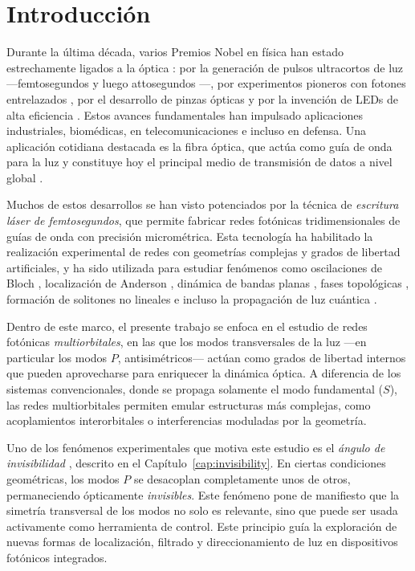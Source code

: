 \chapter{Introducción}

Durante la última década, varios Premios Nobel en física han estado estrechamente ligados a la óptica \cite{nobel}: por la generación de pulsos ultracortos de luz —femtosegundos \cite{femto1} y luego attosegundos \cite{atto1, atto2, atto3}—, por experimentos pioneros con fotones entrelazados \cite{photons1, photons2, photons3}, por el desarrollo de pinzas ópticas \cite{opticaltweezers} y por la invención de LEDs de alta eficiencia \cite{led1, led2, led3}. Estos avances fundamentales han impulsado aplicaciones industriales, biomédicas, en telecomunicaciones e incluso en defensa. Una aplicación cotidiana destacada es la fibra óptica, que actúa como guía de onda para la luz y constituye hoy el principal medio de transmisión de datos a nivel global \cite{fibra2, fibra}.

Muchos de estos desarrollos se han visto potenciados por la técnica de \textit{escritura láser de femtosegundos}, que permite fabricar redes fotónicas tridimensionales de guías de onda con precisión micrométrica. Esta tecnología ha habilitado la realización experimental de redes con geometrías complejas y grados de libertad artificiales, y ha sido utilizada para estudiar fenómenos como oscilaciones de Bloch \cite{BlochOsci}, localización de Anderson \cite{Anderson}, dinámica de bandas planas \cite{lieb1, lieb2, artificialFB, FBdynamics}, fases topológicas \cite{obstopo, obsfloquet, topo1dphoto, toporusos}, formación de solitones no lineales \cite{discretesolitons} e incluso la propagación de luz cuántica \cite{qed, squeezed, topoquantum}.

Dentro de este marco, el presente trabajo se enfoca en el estudio de redes fotónicas \textit{multiorbitales}, en las que los modos transversales de la luz —en particular los modos \( P \), antisimétricos— actúan como grados de libertad internos que pueden aprovecharse para enriquecer la dinámica óptica. A diferencia de los sistemas convencionales, donde se propaga solamente el modo fundamental (\( S \)), las redes multiorbitales permiten emular estructuras más complejas, como acoplamientos interorbitales o interferencias moduladas por la geometría.

Uno de los fenómenos experimentales que motiva este estudio es el \textit{ángulo de invisibilidad} \cite{Pmodecoupling}, descrito en el Capítulo~\ref{cap:invisibility}. En ciertas condiciones geométricas, los modos \( P \) se desacoplan completamente unos de otros, permaneciendo ópticamente \textit{invisibles}. Este fenómeno pone de manifiesto que la simetría transversal de los modos no solo es relevante, sino que puede ser usada activamente como herramienta de control. Este principio guía la exploración de nuevas formas de localización, filtrado y direccionamiento de luz en dispositivos fotónicos integrados.

